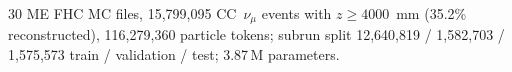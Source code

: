 30 ME FHC MC files, 15{,}799{,}095 CC~$\nu_\mu$ events with $z \ge 4000$~mm (35.2\% reconstructed), 116{,}279{,}360 particle tokens; subrun split 12{,}640{,}819 / 1{,}582{,}703 / 1{,}575{,}573 train / validation / test; 3.87\,M parameters.
